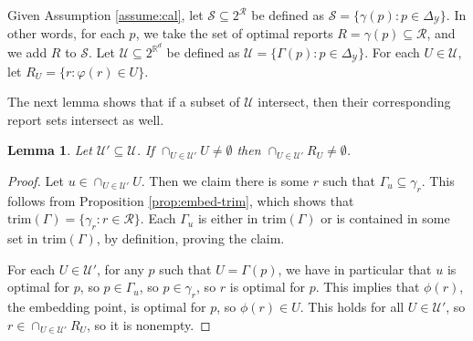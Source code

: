 \documentclass[12pt]{article}
\newcommand{\reals}{\mathbb{R}}
\newcommand{\R}{\mathcal{R}}
\newcommand{\U}{\mathcal{U}}
\newcommand{\Y}{\mathcal{Y}}
\newcommand{\trim}{\mathrm{trim}}
\newtheorem{lemma}{Lemma}
\begin{document}
Given Assumption \ref{assume:cal}, let $\mathcal{S} \subseteq 2^{\R}$ be defined as $\mathcal{S} = \{\gamma(p) : p \in \Delta_{\Y}\}$.
In other words, for each $p$, we take the set of optimal reports $R = \gamma(p) \subseteq \R$, and we add $R$ to $\mathcal{S}$.
Let $\U \subseteq 2^{\reals^d}$ be defined as $\U = \{\Gamma(p) : p \in \Delta_{\Y}\}$.
For each $U \in \U$, let $R_U = \{r: \varphi(r) \in U\}$.

The next lemma shows that if a subset of $\U$ intersect, then their corresponding report sets intersect as well.
\begin{lemma} \label{lemma:calibrated-pos}
  Let $\U' \subseteq \U$.
  If $\cap_{U\in\U'} U \neq \emptyset$ then $\cap_{U\in\U'} R_U \neq \emptyset$.
\end{lemma}
\begin{proof}
  Let $u \in \cap_{U\in\U'} U$.
  Then we claim there is some $r$ such that $\Gamma_u \subseteq \gamma_r$.
  This follows from Proposition \ref{prop:embed-trim}, which shows that $\trim(\Gamma) = \{ \gamma_r : r \in \R\}$.
  Each $\Gamma_u$ is either in $\trim(\Gamma)$ or is contained in some set in $\trim(\Gamma)$, by definition, proving the claim.

  For each $U \in \U'$, for any $p$ such that $U = \Gamma(p)$, we have in particular that $u$ is optimal for $p$, so $p \in \Gamma_u$, so $p \in \gamma_r$, so $r$ is optimal for $p$.
  This implies that $\phi(r)$, the embedding point, is optimal for $p$, so $\phi(r) \in U$.
  This holds for all $U \in \U'$, so $r \in \cap_{U\in\U'} R_U$, so it is nonempty.
\end{proof}
\end{document}
